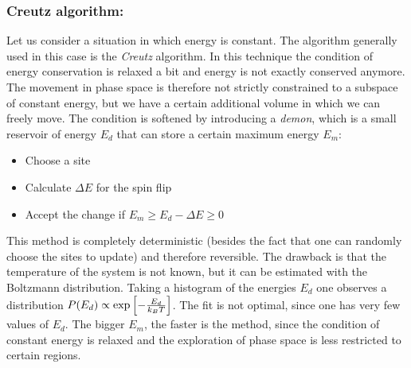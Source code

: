 \subsubsection*{Creutz algorithm:}
Let us consider a situation in which energy is constant. The algorithm generally used in this case is the \emph{Creutz} algorithm. In this technique the condition of energy conservation is relaxed a bit and energy is not exactly conserved anymore. The movement in phase space is therefore not strictly constrained to a subspace of constant energy, but we have a certain additional volume in which we can freely move. The condition is softened by introducing a \emph{demon}, which is a small reservoir of energy $E_d$ that can store a certain maximum energy $E_m$:

\begin{itemize}
\item Choose a site
\item Calculate $\Delta E$ for the spin flip
\item Accept the change if $E_m\ge E_d-\Delta E\ge 0 $
\end{itemize}
This method is completely deterministic (besides the fact that one can randomly choose the sites to update) and therefore reversible. The drawback is that the temperature of the system is not known, but it can be estimated  with the Boltzmann distribution. Taking a histogram of the energies $E_d$ one observes a distribution $P(E_d)\propto \text{exp}\left[ -\frac{E_d}{k_BT} \right]$. The fit is not optimal, since one has very few values of $E_d$. The bigger $E_m$, the faster is the method, since the condition of constant energy is relaxed and the exploration of phase space is less restricted to certain regions. 



